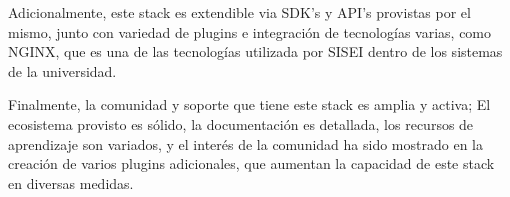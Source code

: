 Adicionalmente, este stack es extendible via SDK's y API's provistas por el mismo, junto con variedad de plugins e integración de tecnologías varias, como NGINX, que es una de las tecnologías utilizada por SISEI dentro de los sistemas de la universidad.

Finalmente, la comunidad y soporte que tiene este stack es amplia y activa; El ecosistema provisto es sólido, la documentación es detallada, los recursos de aprendizaje son variados, y el interés de la comunidad ha sido mostrado en la creación de varios plugins adicionales, que aumentan la capacidad de este stack en diversas medidas.

\clearpage
